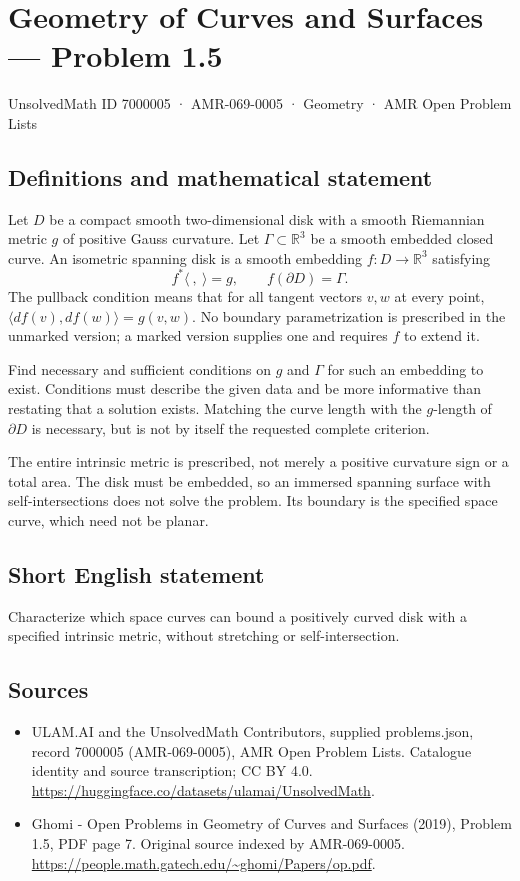 \documentclass[11pt,a4paper]{article}
\begin{document}
\section*{Geometry of Curves and Surfaces — Problem 1.5}\label{7000005}
{\small UnsolvedMath ID 7000005 · AMR-069-0005 · Geometry · AMR Open Problem Lists}
\subsection{Definitions and mathematical statement}
Let $D$ be a compact smooth two-dimensional disk with a smooth
Riemannian metric $g$ of positive Gauss curvature. Let
$\Gamma\subset\mathbb R^3$ be a smooth embedded closed curve.
An isometric spanning disk is a smooth embedding
$f:D\to\mathbb R^3$ satisfying
\[
                      f^*\langle\ ,\ \rangle=g,
                      \qquad f(\partial D)=\Gamma.
\]
The pullback condition means that for all tangent vectors $v,w$
at every point, $\langle df(v),df(w)\rangle=g(v,w)$. No boundary
parametrization is prescribed in the unmarked version; a marked
version supplies one and requires $f$ to extend it.

Find necessary and sufficient conditions on $g$ and $\Gamma$ for
such an embedding to exist. Conditions must describe the given
data and be more informative than restating that a solution
exists. Matching the curve length with the $g$-length of
$\partial D$ is necessary, but is not by itself the requested
complete criterion.

The entire intrinsic metric is prescribed, not merely a positive
curvature sign or a total area. The disk must be embedded, so an
immersed spanning surface with self-intersections does not solve
the problem. Its boundary is the specified space curve, which
need not be planar.
\subsection{Short English statement}
Characterize which space curves can bound a positively curved disk
with a specified intrinsic metric, without stretching or
self-intersection.
\subsection{Sources}
\begin{itemize}
\item[S1] ULAM.AI and the UnsolvedMath Contributors, supplied problems.json, record 7000005 (AMR-069-0005), AMR Open Problem Lists. Catalogue identity and source transcription; CC BY 4.0.
\url{https://huggingface.co/datasets/ulamai/UnsolvedMath}.
\item[S2] Ghomi - Open Problems in Geometry of Curves and Surfaces (2019), Problem 1.5, PDF page 7. Original source indexed by AMR-069-0005.
\url{https://people.math.gatech.edu/~ghomi/Papers/op.pdf}.
\end{itemize}
\end{document}
